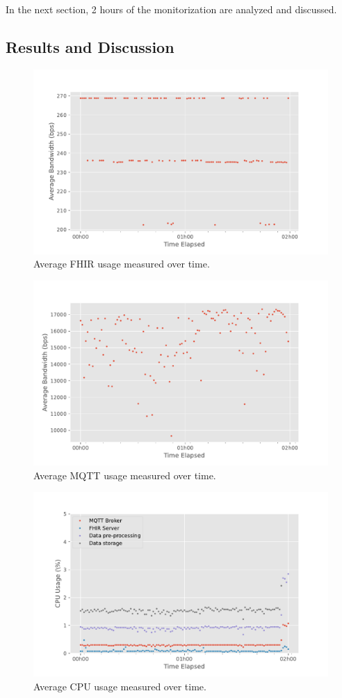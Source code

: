 In the next section, 2 hours of the monitorization are analyzed and discussed. 

\subsection{Results and Discussion}

\begin{figure}[H]
    \centering
    \includegraphics[width=0.66\linewidth]{images/PILOTfhir_bandwidth.pdf}
    \caption{Average \acs{FHIR} usage measured over time.}
    \label{fig:pilot-fhir-bandwidth}
\end{figure}

\begin{figure}[H]
    \centering
    \includegraphics[width=0.66\linewidth]{images/PILOTmqtt_bandwidth.pdf}
    \caption{Average \acs{MQTT} usage measured over time.}
    \label{fig:pilot-mqtt-bandwidth}
\end{figure}

\begin{figure}[H]
    \centering
    \includegraphics[width=0.66\linewidth]{images/PILOTcpu_usage.pdf}
    \caption{Average CPU usage measured over time.}
    \label{fig:pilot-cou-usage}
\end{figure}

